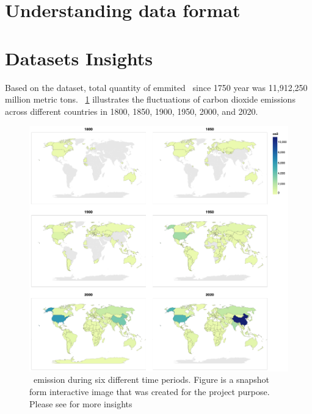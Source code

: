 \section{Understanding data format}

\section{Datasets Insights}

Based on the dataset, total quantity of emmited \coo\ since 1750 year was 11,912,250 million metric tons. 
~\ref{fig:co2_emission_global} illustrates the fluctuations of carbon dioxide emissions across different countries in 1800, 1850, 1900, 1950, 2000, and 2020.
\begin{figure}[h]
  \includegraphics[width=\linewidth]{img/co2emission.png}
  \caption{\coo\ emission during six different time periods. Figure is a snapshot form interactive image that was created for the project purpose. Please see \cite{berkeleyearthdata} for more insights} 
  \label{fig:co2_emission_global}
\end{figure}


